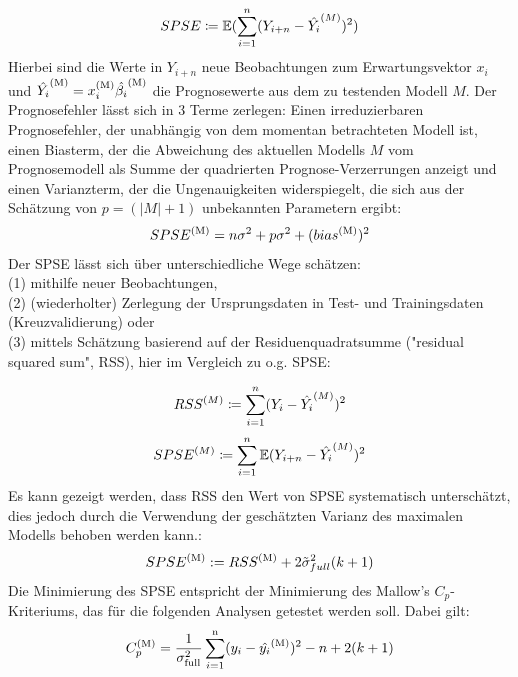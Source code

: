 	\begin{align*}
		SPSE \coloneqq \operatorname{\mathbb{E}}(\sum_{i=1}^{n} (Y_{i+n} - \hat{Y_i}^{(M)})^2)
	\end{align*}
	Hierbei sind die Werte in $Y_{i+n}$ neue Beobachtungen zum Erwartungsvektor $x_i$ und $\hat{Y_i}^{\mathrm{(M)}}  = x_{i}^{\mathrm{(M)}}\hat{\beta_i}^{\mathrm{(M)}}$ die Prognosewerte aus dem zu testenden Modell $M$.
	Der Prognosefehler lässt sich in 3 Terme zerlegen: Einen irreduzierbaren Prognosefehler, der unabhängig von dem momentan betrachteten Modell ist, einen Biasterm, der die Abweichung des aktuellen Modells $M$ vom Prognosemodell als Summe der quadrierten Prognose-Verzerrungen anzeigt und einen Varianzterm, der die Ungenauigkeiten widerspiegelt, die sich aus der Schätzung von $p = (|M|+1)$ unbekannten Parametern ergibt:
	\begin{align*}
		SPSE^{\mathrm{(M)}} = n\sigma^2 + p\sigma^2 + (bias^{\mathrm{(M)}})^2
	\end{align*}
	Der SPSE lässt sich über unterschiedliche Wege schätzen: \\(1) mithilfe neuer Beobachtungen, \\(2) (wiederholter) Zerlegung der Ursprungsdaten in Test- und Trainingsdaten (Kreuzvalidierung)  oder \\(3) mittels Schätzung basierend auf der Residuenquadratsumme ("residual squared sum", RSS), hier im Vergleich zu o.g. SPSE:

	\begin{align*}
	RSS^{(M)} \coloneqq \sum_{i=1}^{n} (Y_{i} - \hat{Y_i}^{(M)})^2
	\end{align*}
	\begin{align*}
	SPSE^{(M)} \coloneqq \sum_{i=1}^{n} \operatorname{\mathbb{E}} (Y_{i+n} - \hat{Y_i}^{(M)})^2
	\end{align*}
  Es kann gezeigt werden, dass RSS den Wert von SPSE systematisch unterschätzt, dies jedoch durch die Verwendung der geschätzten Varianz des maximalen Modells behoben werden kann.\cite{Schumacher.2019}:
	\begin{equation}\label{eq:spse_true}
	SPSE^{\mathrm{(M)}} := RSS^{\mathrm{(M)}} + 2 \tilde{\sigma}_{full} ^2 (k+1)
	\end{equation}
	Die Minimierung des SPSE entspricht der Minimierung des Mallow's $C_p$- Kriteriums, das für die folgenden Analysen getestet werden soll. Dabei gilt:
	\begin{align*}
	C^{\mathrm{(M)}}_p = \frac{1}{\sigma_{\mathrm{full}}^2} \sum_{i=1}^{\mathrm{n}} (y_i - \hat{y_i}^{\mathrm{(M)}})^2 - n + 2(k+1)
	\end{align*}

